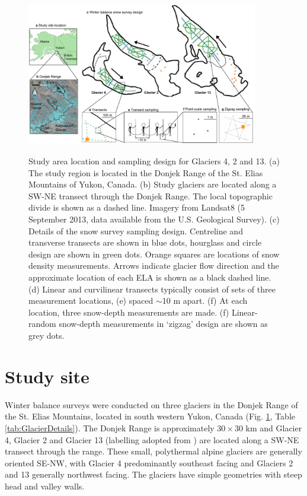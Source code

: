 \documentclass[twocolumn, letterpaper]{igs}
\begin{document}
\begin{figure}
	\centering
	\includegraphics[width =0.9\textwidth]{Sampling.pdf}\\
	\caption{Study area location and sampling design for Glaciers 4, 2 and 13. (a) The study region is located in the Donjek Range of the St. Elias Mountains of Yukon, Canada. (b) Study glaciers are located along a SW-NE transect through the Donjek Range. The local topographic divide is shown as a dashed line. Imagery from Landsat8 (5 September 2013, data available from the U.S. Geological Survey). (c) Details of the snow survey sampling design. Centreline and transverse transects are shown in blue dots, hourglass and circle design are shown in green dots. Orange squares are locations of snow density measurements. Arrows indicate glacier flow direction and the approximate location of each ELA is shown as a black dashed line. (d) Linear and curvilinear transects typically consist of sets of three measurement locations, (e) spaced $\sim$10 m apart. (f) At each location, three snow-depth measurements are made. (f) Linear-random snow-depth measurements in `zigzag' design are shown as grey dots.}
	\label{fig:Sampling}
\end{figure}

\section{Study site}

Winter balance surveys were conducted on three glaciers in the Donjek Range of the St. Elias Mountains, located in south western Yukon, Canada (Fig. \ref{fig:Sampling}, Table \ref{tab:GlacierDetails}). The Donjek Range is approximately $30\times30$ km and Glacier 4, Glacier 2 and Glacier 13 (labelling adopted from \cite{Crompton2016}) are located along a SW-NE transect through the range. These small, polythermal alpine glaciers are generally oriented SE-NW, with Glacier 4 predominantly southeast facing and Glaciers 2 and 13 generally northwest facing. The glaciers have simple geometries with steep head and valley walls. 
\end{document}
